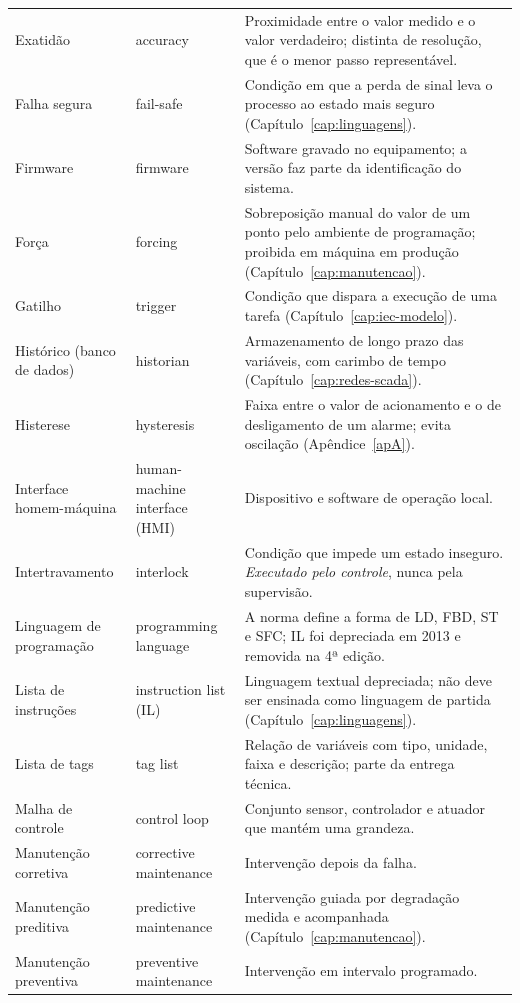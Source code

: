 \begin{longtable}{p{3.3cm} p{3.3cm} p{8.4cm}}
  Exatidão & accuracy & Proximidade entre o valor medido e o valor verdadeiro; distinta de resolução,
    que é o menor passo representável. \\
  Falha segura & fail-safe & Condição em que a perda de sinal leva o processo ao estado mais seguro
    (Capítulo~\ref{cap:linguagens}). \\
  Firmware & firmware & Software gravado no equipamento; a versão faz parte da identificação do
    sistema. \\
  Força & forcing & Sobreposição manual do valor de um ponto pelo ambiente de programação; proibida
    em máquina em produção (Capítulo~\ref{cap:manutencao}). \\
  Gatilho & trigger & Condição que dispara a execução de uma tarefa
    (Capítulo~\ref{cap:iec-modelo}). \\
  Histórico (banco de dados) & historian & Armazenamento de longo prazo das variáveis, com carimbo de
    tempo (Capítulo~\ref{cap:redes-scada}). \\
  Histerese & hysteresis & Faixa entre o valor de acionamento e o de desligamento de um alarme; evita
    oscilação (Apêndice~\ref{apA}). \\
  Interface homem-máquina & human-machine interface (HMI) & Dispositivo e software de operação
    local. \\
  Intertravamento & interlock & Condição que impede um estado inseguro. \emph{Executado pelo
    controle}, nunca pela supervisão. \\
  Linguagem de programação & programming language & A norma define a forma de LD, FBD, ST e SFC; IL
    foi depreciada em 2013 e removida na 4ª edição. \\
  Lista de instruções & instruction list (IL) & Linguagem textual depreciada; não deve ser ensinada
    como linguagem de partida (Capítulo~\ref{cap:linguagens}). \\
  Lista de tags & tag list & Relação de variáveis com tipo, unidade, faixa e descrição; parte da
    entrega técnica. \\
  Malha de controle & control loop & Conjunto sensor, controlador e atuador que mantém uma grandeza.
    \\
  Manutenção corretiva & corrective maintenance & Intervenção depois da falha. \\
  Manutenção preditiva & predictive maintenance & Intervenção guiada por degradação medida e
    acompanhada (Capítulo~\ref{cap:manutencao}). \\
  Manutenção preventiva & preventive maintenance & Intervenção em intervalo programado. \\

\end{longtable}
